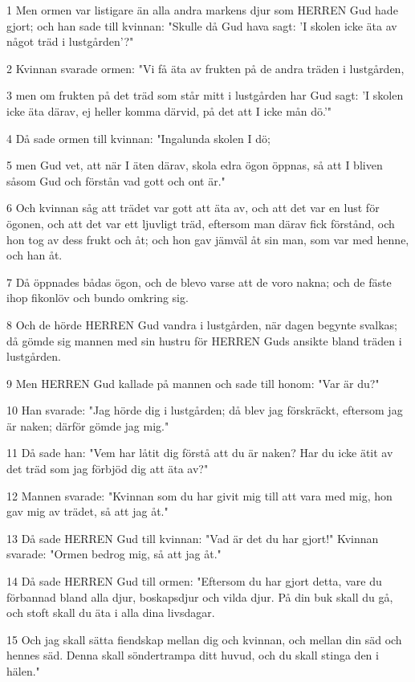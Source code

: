 \par 1 Men ormen var listigare än alla andra markens djur som HERREN Gud hade gjort; och han sade till kvinnan: "Skulle då Gud hava sagt: 'I skolen icke äta av något träd i lustgården'?"
\par 2 Kvinnan svarade ormen: "Vi få äta av frukten på de andra träden i lustgården,
\par 3 men om frukten på det träd som står mitt i lustgården har Gud sagt: 'I skolen icke äta därav, ej heller komma därvid, på det att I icke mån dö.'"
\par 4 Då sade ormen till kvinnan: "Ingalunda skolen I dö;
\par 5 men Gud vet, att när I äten därav, skola edra ögon öppnas, så att I bliven såsom Gud och förstån vad gott och ont är."
\par 6 Och kvinnan såg att trädet var gott att äta av, och att det var en lust för ögonen, och att det var ett ljuvligt träd, eftersom man därav fick förstånd, och hon tog av dess frukt och åt; och hon gav jämväl åt sin man, som var med henne, och han åt.
\par 7 Då öppnades bådas ögon, och de blevo varse att de voro nakna; och de fäste ihop fikonlöv och bundo omkring sig.
\par 8 Och de hörde HERREN Gud vandra i lustgården, när dagen begynte svalkas; då gömde sig mannen med sin hustru för HERREN Guds ansikte bland träden i lustgården.
\par 9 Men HERREN Gud kallade på mannen och sade till honom: "Var är du?"
\par 10 Han svarade: "Jag hörde dig i lustgården; då blev jag förskräckt, eftersom jag är naken; därför gömde jag mig."
\par 11 Då sade han: "Vem har låtit dig förstå att du är naken? Har du icke ätit av det träd som jag förbjöd dig att äta av?"
\par 12 Mannen svarade: "Kvinnan som du har givit mig till att vara med mig, hon gav mig av trädet, så att jag åt."
\par 13 Då sade HERREN Gud till kvinnan: "Vad är det du har gjort!" Kvinnan svarade: "Ormen bedrog mig, så att jag åt."
\par 14 Då sade HERREN Gud till ormen: "Eftersom du har gjort detta, vare du förbannad bland alla djur, boskapsdjur och vilda djur. På din buk skall du gå, och stoft skall du äta i alla dina livsdagar.
\par 15 Och jag skall sätta fiendskap mellan dig och kvinnan, och mellan din säd och hennes säd. Denna skall söndertrampa ditt huvud, och du skall stinga den i hälen."
